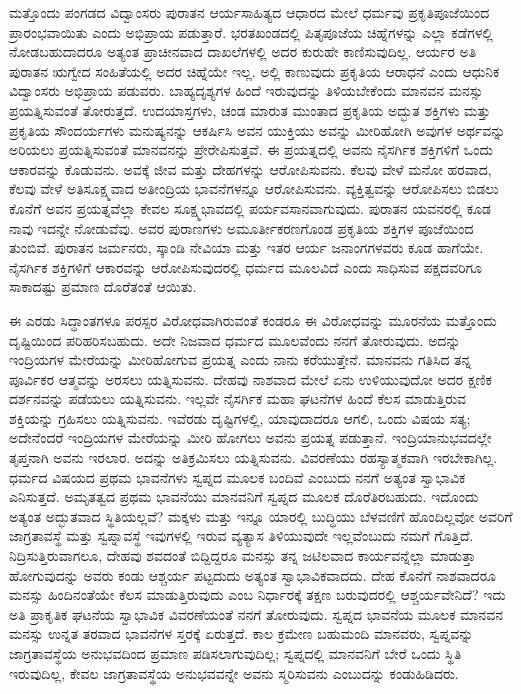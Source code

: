ಮತ್ತೊಂದು ಪಂಗಡದ ವಿದ್ವಾಂಸರು ಪುರಾತನ ಆರ್ಯಸಾಹಿತ್ಯದ ಆಧಾರದ ಮೇಲೆ ಧರ್ಮವು ಪ್ರಕೃತಿಪೂಜೆಯಿಂದ ಪ್ರಾರಂಭವಾಯಿತು ಎಂದು ಅಭಿಪ್ರಾಯ ಪಡುತ್ತಾರೆ. ಭರತಖಂಡದಲ್ಲಿ ಪಿತೃಪೂಜೆಯ ಚಿಹ್ನೆಗಳನ್ನು ಎಲ್ಲಾ ಕಡೆಗಳಲ್ಲಿ ನೋಡಬಹುದಾದರೂ ಅತ್ಯಂತ ಪ್ರಾಚೀನವಾದ ದಾಖಲೆಗಳಲ್ಲಿ ಅದರ ಕುರುಹೇ ಕಾಣಿಸುವುದಿಲ್ಲ. ಆರ್ಯರ ಅತಿ ಪುರಾತನ ಋಗ್ವೇದ ಸಂಹಿತೆಯಲ್ಲಿ ಅದರ ಚಿಹ್ನೆಯೇ ಇಲ್ಲ. ಅಲ್ಲಿ ಕಾಣುವುದು ಪ್ರಕೃತಿಯ ಆರಾಧನೆ ಎಂದು ಆಧುನಿಕ ವಿದ್ವಾಂಸರು ಅಭಿಪ್ರಾಯ ಪಡುವರು. ಬಾಹ್ಯದೃಶ್ಯಗಳ ಹಿಂದೆ ಇರುವುದನ್ನು ತಿಳಿಯಬೇಕೆಂದು ಮಾನವನ ಮನಸ್ಸು ಪ್ರಯತ್ನಿಸುವಂತೆ ತೋರುತ್ತದೆ. ಉದಯಾಸ್ತಗಳು, ಚಂಡ ಮಾರುತ ಮುಂತಾದ ಪ್ರಕೃತಿಯ ಅದ್ಭುತ ಶಕ್ತಿಗಳು ಮತ್ತು ಪ್ರಕೃತಿಯ ಸೌಂದರ್ಯಗಳು ಮನುಷ್ಯನನ್ನು ಆಕರ್ಷಿಸಿ ಅವನ ಯುಕ್ತಿಯು ಅವನ್ನು ಮೀರಿಹೋಗಿ ಅವುಗಳ ಅರ್ಥವನ್ನು ಅರಿಯಲು ಪ್ರಯತ್ನಿಸುವಂತೆ ಮಾನವನನ್ನು ಪ್ರೇರೇಪಿಸುತ್ತವೆ. ಈ ಪ್ರಯತ್ನದಲ್ಲಿ ಅವನು ನೈಸರ್ಗಿಕ ಶಕ್ತಿಗಳಿಗೆ ಒಂದು ಆಕಾರವನ್ನು ಕೊಡುವನು. ಅವಕ್ಕೆ ಜೀವ ಮತ್ತು ದೇಹಗಳನ್ನು ಆರೋಪಿಸುವನು. ಕೆಲವು ವೇಳೆ ಮನೋ ಹರವಾದ, ಕೆಲವು ವೇಳೆ ಅತಿಸೂಕ್ಷ್ಮವಾದ ಅತೀಂದ್ರಿಯ ಭಾವನೆಗಳನ್ನೂ ಆರೋಪಿಸುವನು. ವ್ಯಕ್ತಿತ್ವವನ್ನು ಆರೋಪಿಸಲು ಬಿಡಲು ಕೊನೆಗೆ ಅವನ ಪ್ರಯತ್ನವೆಲ್ಲಾ ಕೇವಲ ಸೂಕ್ಷ್ಮಭಾವದಲ್ಲಿ ಪರ್ಯವಸಾನವಾಗುವುದು. ಪುರಾತನ ಯವನರಲ್ಲಿ ಕೂಡ ನಾವು ಇದನ್ನೇ ನೋಡುವೆವು. ಅವರ ಪುರಾಣಗಳು ಅಮೂರ್ತೀಕರಣಗೊಂಡ ಪ್ರಕೃತಿಯ ಶಕ್ತಿಗಳ ಪೂಜೆಯಿಂದ ತುಂಬಿವೆ. ಪುರಾತನ ಜರ್ಮನರು, ಸ್ಕಾಂಡಿ ನೇವಿಯಾ ಮತ್ತು ಇತರ ಆರ್ಯ ಜನಾಂಗಗಳವರು ಕೂಡ ಹಾಗೆಯೇ. ನೈಸರ್ಗಿಕ ಶಕ್ತಿಗಳಿಗೆ ಆಕಾರವನ್ನು ಆರೋಪಿಸುವುದರಲ್ಲಿ ಧರ್ಮದ ಮೂಲವಿದೆ ಎಂದು ಸಾಧಿಸುವ ಪಕ್ಷದವರಿಗೂ ಸಾಕಾದಷ್ಟು ಪ್ರಮಾಣ ದೊರೆತಂತೆ ಆಯಿತು.

ಈ ಎರಡು ಸಿದ್ಧಾಂತಗಳೂ ಪರಸ್ಪರ ವಿರೋಧವಾಗಿರುವಂತೆ ಕಂಡರೂ ಈ ವಿರೋಧವನ್ನು ಮೂರನೆಯ ಮತ್ತೊಂದು ದೃಷ್ಟಿಯಿಂದ ಪರಿಹರಿಸಬಹುದು. ಅದೇ ನಿಜವಾದ ಧರ್ಮದ ಮೂಲವೆಂದು ನನಗೆ ತೋರುವುದು. ಅದನ್ನು ಇಂದ್ರಿಯಗಳ ಮೇರೆಯನ್ನು ಮೀರಿಹೋಗುವ ಪ್ರಯತ್ನ ಎಂದು ನಾನು ಕರೆಯುತ್ತೇನೆ. ಮಾನವನು ಗತಿಸಿದ ತನ್ನ ಪೂರ್ವಿಕರ ಆತ್ಮವನ್ನು ಅರಸಲು ಯತ್ನಿಸುವನು. ದೇಹವು ನಾಶವಾದ ಮೇಲೆ ಏನು ಉಳಿಯುವುದೋ ಅದರ ಕ್ಷಣಿಕ ದರ್ಶನವನ್ನು ಪಡೆಯಲು ಯತ್ನಿಸುವನು. ಇಲ್ಲವೇ ನೈಸರ್ಗಿಕ ಮಹಾ ಘಟನೆಗಳ ಹಿಂದೆ ಕೆಲಸ ಮಾಡುತ್ತಿರುವ ಶಕ್ತಿಯನ್ನು ಗ್ರಹಿಸಲು ಯತ್ನಿಸುವನು. ಇವೆರಡು ದೃಷ್ಟಿಗಳಲ್ಲಿ, ಯಾವುದಾದರೂ ಆಗಲಿ, ಒಂದು ವಿಷಯ ಸತ್ಯ; ಅದೇನೆಂದರೆ ಇಂದ್ರಿಯಗಳ ಮೇರೆಯನ್ನು ಮೀರಿ ಹೋಗಲು ಅವನು ಪ್ರಯತ್ನ ಪಡುತ್ತಾನೆ. ಇಂದ್ರಿಯಾನುಭವದಲ್ಲೇ ತೃಪ್ತನಾಗಿ ಅವನು ಇರಲಾರ. ಅದನ್ನು ಅತಿಕ್ರಮಿಸಲು ಯತ್ನಿಸುವನು. ವಿವರಣೆಯು ರಹಸ್ಯಾತ್ಮಕವಾಗಿ ಇರಬೇಕಾಗಿಲ್ಲ. ಧರ್ಮದ ವಿಷಯದ ಪ್ರಥಮ ಭಾವನೆಗಳು ಸ್ವಪ್ನದ ಮೂಲಕ ಬಂದಿವೆ ಎಂಬುದು ನನಗೆ ಅತ್ಯಂತ ಸ್ವಾಭಾವಿಕ ಎನಿಸುತ್ತದೆ. ಅಮೃತತ್ವದ ಪ್ರಥಮ ಭಾವನೆಯು ಮಾನವನಿಗೆ ಸ್ವಪ್ನದ ಮೂಲಕ ದೊರೆತಿರಬಹುದು. ಇದೊಂದು ಅತ್ಯಂತ ಅದ್ಭುತವಾದ ಸ್ಥಿತಿಯಲ್ಲವೆ? ಮಕ್ಕಳು ಮತ್ತು ಇನ್ನೂ ಯಾರಲ್ಲಿ ಬುದ್ಧಿಯು ಬೆಳವಣಿಗೆ ಹೊಂದಿಲ್ಲವೋ ಅವರಿಗೆ ಜಾಗ್ರತಾವಸ್ಥೆ ಮತ್ತು ಸ್ವಪ್ನಾವಸ್ಥೆ ಇವುಗಳಲ್ಲಿ ಇರುವ ವ್ಯತ್ಯಾಸ ತಿಳಿಯುವುದೇ ಇಲ್ಲವೆಂಬುದು ನಮಗೆ ಗೊತ್ತಿದೆ. ನಿದ್ರಿಸುತ್ತಿರುವಾಗಲೂ, ದೇಹವು ಶವದಂತೆ ಬಿದ್ದಿದ್ದರೂ ಮನಸ್ಸು ತನ್ನ ಜಟಿಲವಾದ ಕಾರ್ಯವನ್ನೆಲ್ಲಾ ಮಾಡುತ್ತಾ ಹೋಗುವುದನ್ನು ಅವರು ಕಂಡು ಆಶ್ಚರ್ಯ ಪಟ್ಟದುದು ಅತ್ಯಂತ ಸ್ವಾಭಾವಿಕವಾದದು. ದೇಹ ಕೊನೆಗೆ ನಾಶವಾದರೂ ಮನಸ್ಸು ಹಿಂದಿನಂತೆಯೇ ಕೆಲಸ ಮಾಡುತ್ತಿರುವುದು ಎಂಬ ನಿರ್ಧಾರಕ್ಕೆ ತಕ್ಷಣ ಬರುವುದರಲ್ಲಿ ಆಶ್ಚರ್ಯವೇನಿದೆ? ಇದು ಅತಿ ಪ್ರಾಕೃತಿಕ ಘಟನೆಯ ಸ್ವಾಭಾವಿಕ ವಿವರಣೆಯಂತೆ ನನಗೆ ತೋರುವುದು. ಸ್ವಪ್ನದ ಭಾವನೆಯ ಮೂಲಕ ಮಾನವನ ಮನಸ್ಸು ಉನ್ನತ ತರವಾದ ಭಾವನೆಗಳ ಸ್ತರಕ್ಕೆ ಏರುತ್ತದೆ. ಕಾಲ ಕ್ರಮೇಣ ಬಹುಮಂದಿ ಮಾನವರು, ಸ್ವಪ್ನವನ್ನು ಜಾಗ್ರತಾವಸ್ಥೆಯ ಅನುಭವದಿಂದ ಪ್ರಮಾಣ ಪಡಿಸಲಾಗುವುದಿಲ್ಲ; ಸ್ವಪ್ನದಲ್ಲಿ ಮಾನವನಿಗೆ ಬೇರೆ ಒಂದು ಸ್ಥಿತಿ ಇರುವುದಿಲ್ಲ, ಕೇವಲ ಜಾಗ್ರತಾವಸ್ಥೆಯ ಅನುಭವವನ್ನೇ ಅವನು ಸ್ಮರಿಸುವನು ಎಂಬುದನ್ನು ಕಂಡುಹಿಡಿದರು.

